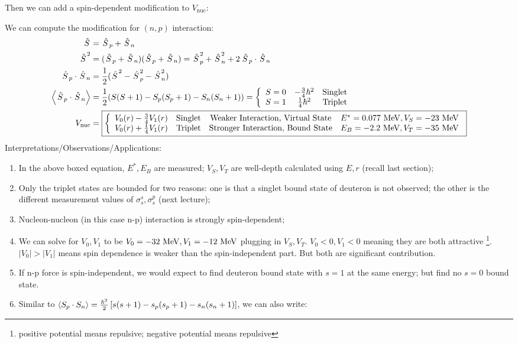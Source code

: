 \documentclass{school-22.101-notes}
\begin{document}
Then we can add a spin-dependent modification to $V_{\mathrm{nuc}}$:

We can compute the modification for $(n,p)$ interaction:
\begin{align*}
\left. \hat{S} \right. &= \left. \hat{S} \right._p + \left. \hat{S} \right._n \\
\left. \hat{S} \right.^2 &= (\left. \hat{S} \right._p + \left. \hat{S} \right._n )(\left. \hat{S} \right._p + \left. \hat{S} \right._n) = \left. \hat{S} \right._p^2 + \left. \hat{S} \right._n^2 + 2 \left. \hat{S} \right._p \cdot \left. \hat{S} \right._n \\
\left. \hat{S} \right._p \cdot \left. \hat{S} \right._n &= \frac{1}{2} (\left. \hat{S} \right.^2 - \left. \hat{S} \right._p^2 - \left. \hat{S} \right._n^2) \\
\left< \left. \hat{S} \right._p \cdot \left. \hat{S} \right._n \right>&= \frac{1}{2} (S(S+1) - S_p (S_p+1) - S_n (S_n+1) ) 
= \left\{ \begin{array}{ccc} S=0 & -\frac{3}{4} \hbar^2 & \mbox{Singlet} \\ S=1 & \frac{1}{4} \hbar^2 & \mbox{Triplet} \end{array} \right. \\
V_{\mathrm{nuc}} &= \boxed{ \left\{ \begin{array}{cccc} 
V_0 (r) - \frac{3}{4} V_1(r)  & \mbox{Singlet}& \mbox{Weaker Interaction, Virtual State} & E^* = 0.077 \mbox{ } \mathrm{MeV}, V_S = -23 \mbox{ } \mathrm{MeV} \\ 
V_0 (r) + \frac{1}{4} V_1(r)  & \mbox{Triplet}& \mbox{Stronger Interaction, Bound State} & E_B = -2.2 \mbox{ } \mathrm{MeV}, V_T = -35 \mbox{ } \mathrm{MeV}
\end{array}\right. } \\
\end{align*}
Interpretations/Observations/Applications:
\begin{enumerate}
\item In the above boxed equation, $E^*, E_B$ are measured; $V_S, V_T$ are well-depth calculated using $E, r$ (recall last section);
\item Only the triplet states are bounded for two reasons: one is that a singlet bound state of deuteron is not observed; the other is the different measurement values of $\sigma_s^s, \sigma_s^p$ (next lecture);
\item Nucleon-nucleon (in this case n-p) interaction is strongly spin-dependent;
\item We can solve for $V_0, V_1$ to be $V_0 = -32 \mbox{ } \mathrm{MeV}, V_1 = -12 \mbox{ } \mathrm{MeV}$ plugging in $V_S, V_T$.
$V_0 <0, V_1 <0$ meaning they are both attractive \footnote{positive potential means repulsive; negative potential means repulsive}. $|V_0| > |V_1|$ means spin dependence is weaker than the spin-independent part. But both are significant contribution. 
\item If n-p force is spin-independent, we would expect to find deuteron bound state with $s=1$ at the same energy; but find no $s=0$ bound state. 

\item Similar to $ \left< S_p \cdot S_n \right> = \frac{\hbar^2}{2} \left[ s(s+1) - s_p (s_p + 1) - s_n (s_n + 1) \right] $, we can also write:
\end{enumerate}
\end{document}
